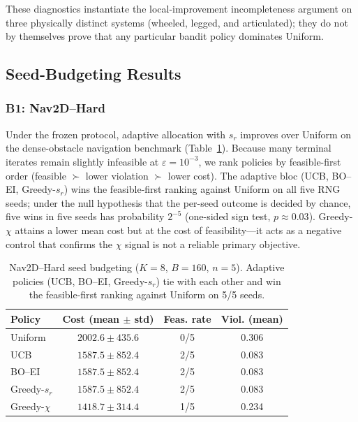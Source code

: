 \documentclass[lettersize,journal]{IEEEtran}
\begin{document}
These diagnostics instantiate the local-improvement incompleteness argument
on three physically distinct systems (wheeled, legged, and articulated);
they do not by themselves prove that any particular bandit policy dominates
Uniform.

\subsection{Seed-Budgeting Results}
\label{sec:budgeting_results}

\subsubsection{B1: Nav2D--Hard}

Under the frozen protocol, adaptive allocation with $s_r$ improves over
Uniform on the dense-obstacle navigation benchmark
(Table~\ref{tab:b1_results}).  Because many terminal iterates remain slightly
infeasible at $\varepsilon=10^{-3}$, we rank policies by feasible-first order
(feasible $\succ$ lower violation $\succ$ lower cost).  The adaptive bloc
(UCB, BO--EI, Greedy-$s_r$) wins the feasible-first ranking against Uniform
on all five RNG seeds; under the null hypothesis that the per-seed outcome
is decided by chance, five wins in five seeds has probability $2^{-5}$
(one-sided sign test, $p \approx 0.03$).  Greedy-$\chi$ attains a lower mean
cost but at the cost of feasibility---it acts as a negative control that
confirms the $\chi$ signal is not a reliable primary objective.

\begin{table}[t]
\caption{Nav2D--Hard seed budgeting ($K=8$, $B=160$, $n=5$).  Adaptive
policies (UCB, BO--EI, Greedy-$s_r$) tie with each other and win the
feasible-first ranking against Uniform on 5/5 seeds.}
\label{tab:b1_results}
\centering
\footnotesize
\setlength{\tabcolsep}{4pt}
\begin{tabular}{lccc}
\toprule
Policy & Cost (mean $\pm$ std) & Feas. rate & Viol. (mean) \\
\midrule
Uniform & $2002.6 \pm 435.6$ & 0/5 & 0.306 \\
UCB & $1587.5 \pm 852.4$ & 2/5 & 0.083 \\
BO--EI & $1587.5 \pm 852.4$ & 2/5 & 0.083 \\
Greedy-$s_r$ & $1587.5 \pm 852.4$ & 2/5 & 0.083 \\
Greedy-$\chi$ & $1418.7 \pm 314.4$ & 1/5 & 0.234 \\
\bottomrule
\end{tabular}
\end{table}
\end{document}
